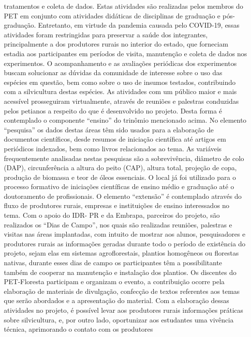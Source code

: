tratamentos e coleta de dados. Estas atividades são realizadas pelos membros do PET em
conjunto com atividades didáticas de disciplinas de graduação e pós-graduação. Entretanto, em
virtude da pandemia causada pelo COVID-19, essas atividades foram restringidas para preservar
a saúde dos integrantes, principalmente a dos produtores rurais no interior do estado, que
forneciam estadia aos participantes em períodos de visita, manutenção e coleta de dados nos
experimentos. O acompanhamento e as avaliações periódicas dos experimentos buscam
solucionar as dúvidas da comunidade de interesse sobre o uso das espécies em questão, bem
como sobre o uso de insumos testados, contribuindo com a silvicultura destas espécies. As
atividades com um público maior e mais acessível prosseguiram virtualmente, através de
reuniões e palestras conduzidas pelos petianos a respeito do que é desenvolvido no projeto. Desta
forma é contemplado o componente “ensino” do trinômio mencionado acima. No elemento
“pesquisa” os dados destas áreas têm sido usados para a elaboração de documentos científicos,
desde resumos de iniciação científica até artigos em periódicos indexados, bem como livros
relacionados ao tema. As variáveis frequentemente analisadas nestas pesquisas são a
sobrevivência, diâmetro de colo (DAP), circunferência a altura do peito (CAP), altura total,
projeção de copa, produção de biomassa e teor de óleos essenciais. O local já foi utilizado para o
processo formativo de iniciações científicas de ensino médio e graduação até o doutoramento de
profissionais. O elemento “extensão” é contemplado através do fluxo de produtores rurais,
empresas e instituições de ensino interessados no tema. Com o apoio do IDR- PR e da Embrapa,
parceiros do projeto, são realizados os “Dias de Campo”, nos quais são realizadas reuniões,
palestras e visitas nas áreas implantadas, com intuito de mostrar aos alunos, pesquisadores e
produtores rurais as informações geradas durante todo o período de existência do projeto, sejam
elas em sistemas agroflorestais, plantios homogêneos ou florestas nativas, durante esses dias de
campo os participantes têm a possibilitante também de cooperar na manutenção e instalação dos
plantios. Os discentes do PET-Floresta participam e organizam o evento, a contribuição ocorre
pela elaboração de materiais de divulgação, confecção de textos referentes aos temas que serão
abordados e a apresentação do material. Com a elaboração dessas atividades no projeto, é
possível levar aos produtores rurais informações práticas sobre silvicultura, e, por outro lado,
oportunizar aos estudantes uma vivência técnica, aprimorando o contato com os produtores
